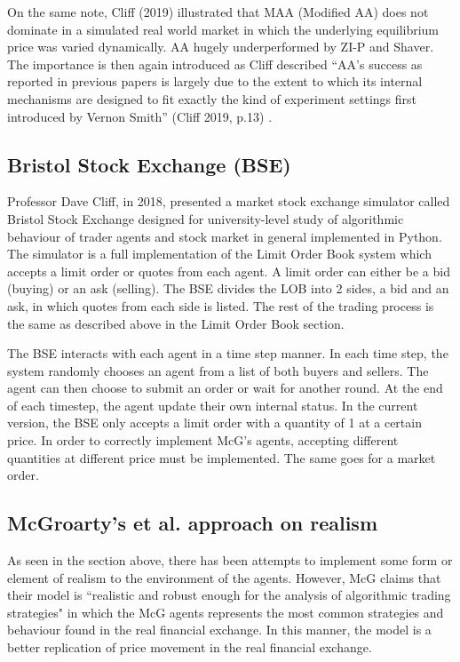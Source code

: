\documentclass{article}
\begin{document}
On the same note, Cliff (2019) illustrated that MAA (Modified AA) does not dominate in a simulated real world market in which the underlying equilibrium price was varied dynamically. AA hugely underperformed by ZI-P and Shaver. The importance is then again introduced as Cliff described ``AA’s success as reported in previous papers is largely due to the extent to which its internal mechanisms are designed to fit exactly the kind of experiment settings first introduced by Vernon Smith” (Cliff 2019, p.13) \cite{dcliff2013}. 

\subsection{Bristol Stock Exchange (BSE)}
Professor Dave Cliff, in 2018, presented a market stock exchange simulator called Bristol Stock Exchange designed for university-level study of algorithmic behaviour of trader agents and stock market in general implemented in Python. The simulator is a full implementation of the Limit Order Book system which accepts a limit order or quotes from each agent. A limit order can either be a bid (buying) or an ask (selling). The BSE divides the LOB into 2 sides, a bid and an ask, in which quotes from each side is listed. The rest of the trading process is the same as described above in the Limit Order Book section. 

The BSE interacts with each agent in a time step manner. In each time step, the system randomly chooses an agent from a list of both buyers and sellers. The agent can then choose to submit an order or wait for another round. At the end of each timestep, the agent update their own internal status. In the current version, the BSE only accepts a limit order with a quantity of 1 at a certain price. In order to correctly implement McG’s agents, accepting different quantities at different price must be implemented. The same goes for a market order. 

\subsection{McGroarty's et al. approach on realism}
As seen in the section above, there has been attempts to implement some form or element of realism to the environment of the agents. However, McG claims that their model is ``realistic and robust enough for the analysis of algorithmic trading strategies"\cite{McGroarty} in which the McG agents represents the most common strategies and behaviour found in the real financial exchange. In this manner, the model is a better replication of price movement in the real financial exchange. 
\end{document}

